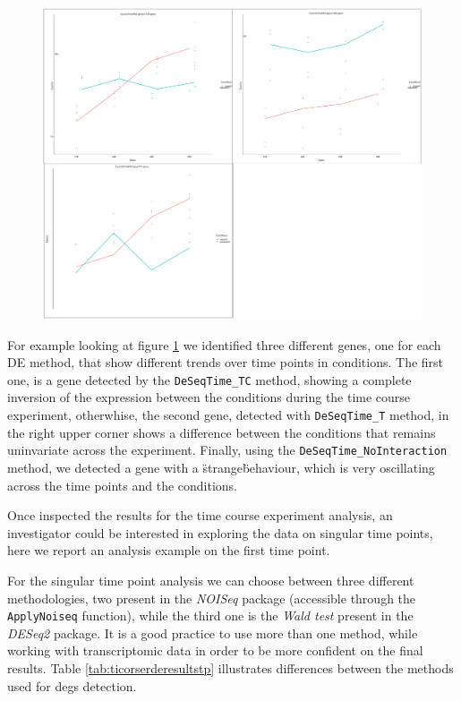 \begin{figure}[H]
\includegraphics[width=\textwidth,height=\textheight,keepaspectratio]{img/ticorser/de/trends/trends.pdf}
\caption[ticorser genes trends]{}
\label{fig:ticorsertrends}
\centering
\end{figure}

For example looking at figure \ref{fig:ticorsertrends} we identified three different genes, one for each DE method, that show different trends over time points in conditions.
The first one, is a gene detected by the \lstinline!DeSeqTime_TC! method, showing a complete inversion of the expression between the conditions during the time course experiment, otherwhise, the second gene, detected with \lstinline!DeSeqTime_T! method, in the right upper corner shows a difference between the conditions that remains uninvariate across the experiment.
Finally, using the \lstinline!DeSeqTime_NoInteraction! method, we detected a gene with a \"strange\" behaviour, which is very oscillating across the time points and the conditions. 

Once inspected the results for the time course experiment analysis, an investigator could be interested in exploring the data on singular time points, here we report an analysis example on the first time point.

For the singular time point analysis we can choose between three different methodologies, two present in the \textit{NOISeq} package (accessible through the \lstinline!ApplyNoiseq! function), while the third one is the \textit{Wald test} present in the \textit{DESeq2} package.
It is a good practice to use more than one method, while working with transcriptomic data in order to be more confident on the final results.
Table \ref{tab:ticorserderesultstp} illustrates differences between the methods used for \glspl{deg} detection.


